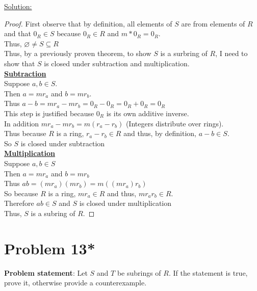 \documentclass{article} %
\begin{document}
\underline{Solution:} 
\begin{addmargin}[1em]{0em}
\begin{proof}
First observe that by definition, all elements of $S$ are from elements of $R$ and that $0_R \in S$ because $0_R \in R$ and $m * 0_R = 0_R$.
\\Thus, $\varnothing \neq S \subseteq R$
\\Thus, by a previously proven theorem, to show $S$ is a surbring of $R$, I need to show that $S$ is closed under subtraction and multiplication.
\\ \underline{\textbf{Subtraction}}
\\ Suppose $a, b \in S$.
\\ Then $a = mr_a$ and $b = mr_b$.
\\ Thus $a - b = mr_a - mr_b = 0_R - 0_R = 0_R + 0_R = 0_R$
\\ This step is justified because $0_R$ is its own additive inverse.
\\ In addition $mr_a - mr_b = m(r_a - r_b)$ (Integers distribute over rings).
\\ Thus because $R$ is a ring, $r_a - r_b \in R$ and thus, by definition, $a - b \in S$.
\\ So $S$ is closed under subtraction
\\ \underline{\textbf{Multiplication}}
\\ Suppose $a, b \in S$
\\ Then $a = mr_a$ and $b = mr_b$
\\ Thus $ab = (mr_a)(mr_b) = m((mr_a)r_b)$
\\ So because $R$ is a ring, $mr_a \in R$ and thus, $mr_ar_b \in R$.
\\ Therefore $ab \in S$ and $S$ is closed under multiplication
\\ Thus, $S$ is a subring of $R$.
\end{proof}
\end{addmargin}

\newpage


\section*{Problem 13*}


\textbf{Problem statement}: Let $S$ and $T$ be subrings of $R$.  If the statement is true, prove it, otherwise provide a counterexample.
\\
\end{document}
